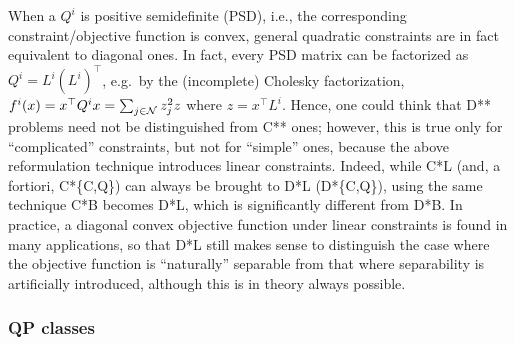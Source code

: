 When a $Q^i$ is positive semidefinite (PSD), i.e., the corresponding constraint/objective function is convex, general quadratic constraints are in fact equivalent to diagonal ones. In fact, every PSD matrix can be factorized as $Q^i = L^i (L^i)^\top$, e.g.~by the (incomplete) Cholesky factorization, $f^i(x) = x^\top Q^i x = \sum_{j \in \mathcal{N}} z^2_jz$ where $z = x^\top L^i$. Hence, one could think that D** problems need not be distinguished from C** ones; however, this is true only for ``complicated'' constraints, but not for ``simple'' ones, because the above reformulation technique introduces linear constraints. Indeed, while C*L (and, a fortiori, C*\{C,Q\}) can always be brought to D*L (D*\{C,Q\}), using the same technique C*B becomes D*L, which is significantly different from D*B. In practice, a diagonal convex objective function under linear constraints is found in many applications, so that D*L still makes sense to distinguish the case where the objective function is ``naturally'' separable from that where separability is artificially introduced, although this is in theory always possible.

\subsubsection{QP classes}\label{ssec:classes}

